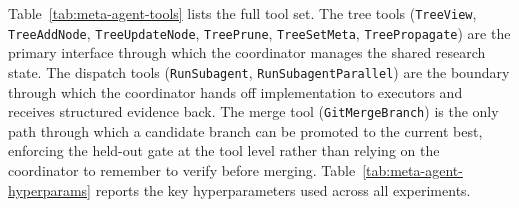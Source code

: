Table~\ref{tab:meta-agent-tools} lists the full tool set. The tree tools
(\texttt{TreeView}, \texttt{TreeAddNode}, \texttt{TreeUpdateNode},
\texttt{TreePrune}, \texttt{TreeSetMeta}, \texttt{TreePropagate}) are the
primary interface through which the coordinator manages the shared research
state. The dispatch tools (\texttt{RunSubagent},
\texttt{RunSubagentParallel}) are the boundary through which the coordinator
hands off implementation to executors and receives structured evidence back.
The merge tool (\texttt{GitMergeBranch}) is the only path through which a
candidate branch can be promoted to the current best, enforcing the held-out gate at the
tool level rather than relying on the coordinator to remember to verify
before merging. Table~\ref{tab:meta-agent-hyperparams} reports the key
hyperparameters used across all experiments.

